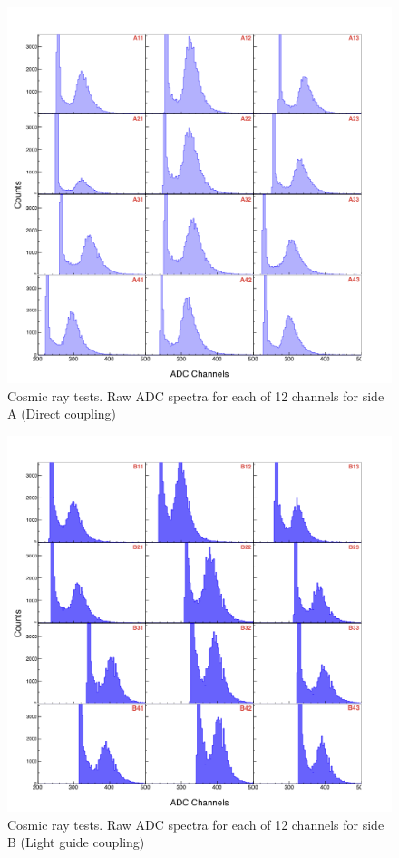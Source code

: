 \begin{figure}[h]
\centering
\includegraphics[width=0.95\linewidth]{images/Fig12a_CosmicsA.png}
\caption{Cosmic ray tests. Raw ADC spectra for each of 12 channels for side A (Direct coupling)}
\label{fig:CosmicsA}
\end{figure}

\begin{figure}[h]
\centering
\includegraphics[width=0.95\linewidth]{images/Fig12b_CosmicsB.png}
\caption{Cosmic ray tests. Raw ADC spectra for each of 12 channels for side B (Light guide coupling)}
\label{fig:CosmicsB}
\end{figure}

